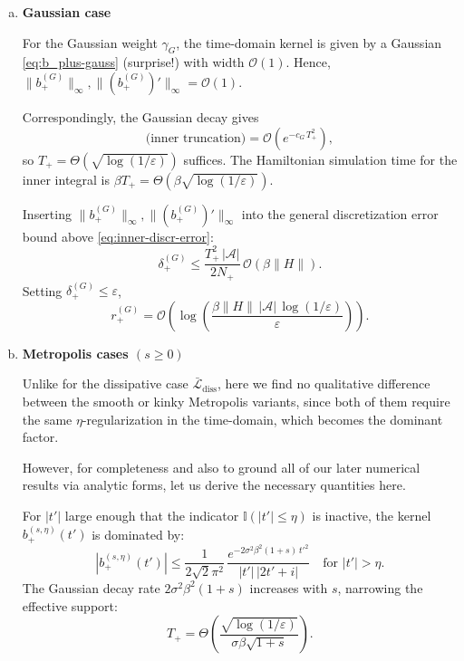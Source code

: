 \begin{enumerate}[(a)]
    \item \textbf{Gaussian case}
    
    For the Gaussian weight $\gamma_G$, the time-domain kernel is given by a Gaussian \eqref{eq:b_plus-gauss} (surprise!) with width $\mathcal{O}(1)$. Hence, $\|b_+^{(G)}\|_\infty, \|(b_+^{(G)})'\|_\infty = \mathcal{O}(1)$.

    Correspondingly, the Gaussian decay gives 
    $$
    \text{(inner truncation)} = \mathcal{O}\!\left(e^{-c_G\, T_+^2}\right),
    $$
    so $T_+ = \Theta(\sqrt{\log(1/\varepsilon)})$ suffices. The Hamiltonian simulation time for the inner integral is $\beta T_+ = \Theta(\beta\sqrt{\log(1/\varepsilon)})$.

    Inserting $\|b_+^{(G)}\|_\infty, \|(b_+^{(G)})'\|_\infty$ into the general discretization error bound above \eqref{eq:inner-discr-error}:
    \begin{equation}
        \delta_+^{(G)} \leq \frac{T_+^2\,|\mathcal{A}|}{2N_+}\,\mathcal{O}(\beta\|H\|).
    \end{equation}
    Setting $\delta^{(G)}_+ \leq \varepsilon$, 
    \begin{equation} \label{eq:r_+_gaussian}
        r_+^{(G)} = \mathcal{O}\!\left(\log\!\left(\frac{\beta\|H\|\,|\mathcal{A}|\,\log(1/\varepsilon)}{\varepsilon}\right)\right).
    \end{equation}
    \item \textbf{Metropolis cases $(s \geq 0)$}
    
    Unlike for the dissipative case $\mathcal{\bar{L}}_\text{diss}$, here we find no qualitative difference between the smooth or kinky Metropolis variants, since both of them require the same $\eta$-regularization in the time-domain, which becomes the dominant factor. 

    However, for completeness and also to ground all of our later numerical results via analytic forms, let us derive the necessary quantities here.

    For $|t'|$ large enough that the indicator $\mathbb{I}(|t'|\leq\eta)$ is inactive, the kernel $b_+^{(s,\eta)}(t')$ is dominated by:
    $$
    |b_+^{(s,\eta)}(t')| \leq \frac{1}{2\sqrt{2}\pi^2}\,\frac{e^{-2\sigma^2\beta^2(1+s)\,t'^2}}{|t'|\,|2t'+i|} \quad\text{for } |t'| > \eta.
    $$
    The Gaussian decay rate $2\sigma^2\beta^2(1+s)$ increases with $s$, narrowing the effective support:
    \begin{equation} \label{eq:T_+_metro}
        T_+ = \Theta\!\left(\frac{\sqrt{\log(1/\varepsilon)}}{\sigma\beta\sqrt{1+s}}\right).
    \end{equation}


\end{enumerate}
